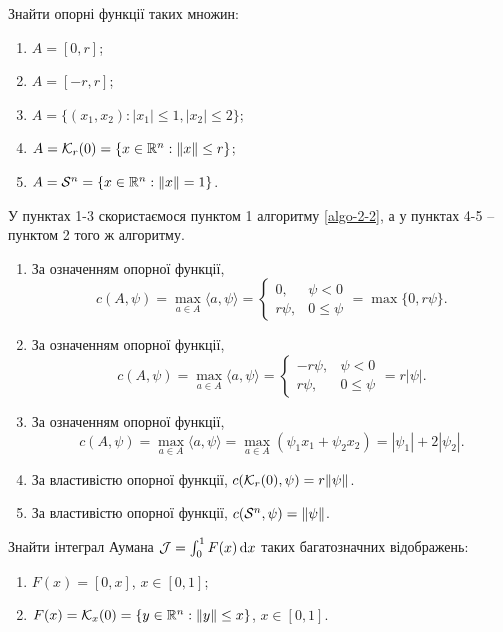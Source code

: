 \begin{problem}
	Знайти опорні функції таких множин:

	\begin{enumerate}
		\item $A = [0, r]$;

		\item $A = [-r, r]$;

		\item $A = \{ (x_1, x_2): |x_1| \le 1, |x_2| \le 2 \}$;

		\item $A = \mathcal{K}_r (0) = \{ x \in \mathbb{R}^n: \|x\| \le r \}$;

		\item $A = \mathcal{S}^n = \{ x \in \mathbb{R}^n: \|x\| = 1 \}$.
	\end{enumerate}
\end{problem}

\begin{solution}
	У пунктах 1-3 скористаємося пунктом 1 алгоритму \ref{algo-2-2},  а у пунктах 4-5 -- пунктом 2 того ж алгоритму.
	\begin{enumerate}
		\item За означенням опорної функції, \[ c(A, \psi) = \max_{a \in A} \langle a, \psi \rangle = \begin{cases} 0, & \psi < 0 \\ r \psi, & 0 \le \psi \end{cases} = \max \{ 0, r \psi \}. \]

		\item За означенням опорної функції, \[ c(A, \psi) = \max_{a \in A} \langle a, \psi \rangle = \begin{cases} - r \psi, & \psi < 0 \\ r \psi, & 0 \le \psi \end{cases} = r |\psi |. \]

		\item За означенням опорної функції, \[ c(A, \psi) = \max_{a \in A} \langle a, \psi \rangle = \max_{a \in A} (\psi_1 x_1 + \psi_2 x_2) = |\psi_1| + 2 |\psi_2|. \]

		\item За властивістю опорної функції, $c(\mathcal{K}_r (0), \psi) = r \| \psi \|$.

		\item За властивістю опорної функції, $c(\mathcal{S}^n, \psi) = \| \psi \|$.
	\end{enumerate}
\end{solution}

\begin{problem}
	Знайти інтеграл Аумана $\mathcal{J} = \int_0^1 F(x) \mathop{}\!\mathrm{d} x$ таких багатозначних відображень:

	\begin{enumerate}
		\item $F(x) = [0, x]$, $x \in [0, 1]$;

		\item $F(x) = \mathcal{K}_x (0) = \{ y \in \mathbb{R}^n: \|y\| \le x \}$, $x \in [0, 1]$.
	\end{enumerate}
\end{problem}

